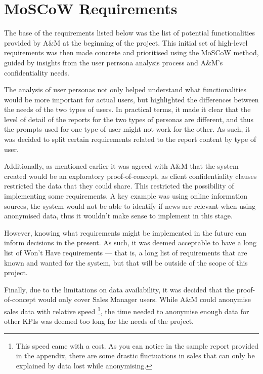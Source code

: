 \documentclass[a4paper]{report}
\begin{document}
\section{MoSCoW Requirements}


\newcommand{\frid}{FR-\arabic{frcounter}}
\newcommand{\nfrid}{NFR-\arabic{nfrcounter}}

The base of the requirements listed below was the list of potential functionalities provided by A\&M at the beginning of the project. This initial set of high-level requirements was then made concrete and prioritised using the MoSCoW method, guided by insights from the user perrsona analysis process and A\&M's confidentiality needs.

The analysis of user personas not only helped understand what functionalities would be more important for actual users, but highlighted the differences between the needs of the two types of users. In practical terms, it made it clear that the level of detail of the reports for the two types of personas are different, and thus the prompts used for one type of user might not work for the other. As such, it was decided to split certain requirements related to the report content by type of user.

Additionally, as mentioned earlier it was agreed with A\&M that the system created would be an exploratory proof-of-concept, as client confidentiality clauses restricted the data that they could share. This restricted the possibility of implementing some requirements. A key example was using online information sources, the system would not be able to identify if news are relevant when using anonymised data, thus it wouldn't make sense to implement in this stage.

However, knowing what requirements might be implemented in the future can inform decisions in the present. As such, it was deemed acceptable to have a long list of Won't Have requirements --- that is, a long list of requirements that are known and wanted for the system, but that will be outside of the scope of this project.

Finally, due to the limitations on data availability, it was decided that the proof-of-concept would only cover Sales Manager users. While A\&M could anonymise sales data with relative speed \footnote{This speed came with a cost. As you can notice in the sample report provided in the appendix, there are some drastic fluctuations in sales that can only be explained by data lost while anonymising.}, the time needed to anonymise enough data for other KPIs was deemed too long for the needs of the project.
\end{document}
